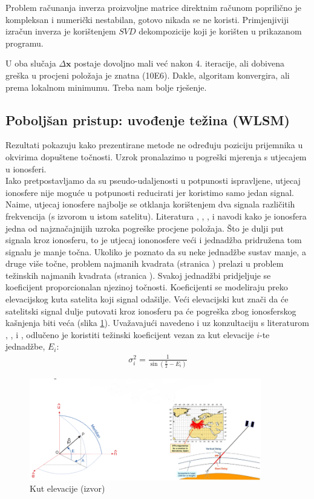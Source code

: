 \documentclass[a4paper,twoside,12pt]{memoir} %
\begin{document}
Problem računanja inverza proizvoljne matrice direktnim računom poprilično je kompleksan i numerički nestabilan, gotovo nikada se ne koristi. 
Primjenjiviji izračun inverza je korištenjem $SVD$ dekompozicije koji je korišten u prikazanom programu.

U oba slučaja $\Delta \mathbf{x}$ postaje dovoljno mali već nakon 4. iteracije, ali dobivena greška u 
procjeni položaja je znatna (10E6).
Dakle, algoritam konvergira, ali prema lokalnom minimumu.
Treba nam bolje rješenje.



\subsection{Poboljšan pristup: uvođenje težina (WLSM)}%
Rezultati pokazuju kako prezentirane metode ne određuju poziciju prijemnika u okvirima dopuštene točnosti.
Uzrok pronalazimo u pogreški mjerenja s utjecajem u ionosferi.\\
Iako pretpostavljamo da su pseudo-udaljenosti u potpunosti ispravljene, utjecaj ionosfere nije moguće u potpunosti reducirati jer koristimo samo jedan signal.
Naime, utjecaj ionosfere najbolje se otklanja korištenjem dva signala različitih frekvencija (s izvorom u istom satelitu). 
Literatura \cite{ref:4}, \cite{ref:9}, \cite{ref:10}, \cite{ref:38} i
\cite{ref:34} navodi kako je ionosfera jedna od najznačajnijih uzroka pogreške
procjene položaja.
Što je dulji put signala kroz ionosferu, to je utjecaj iononosfere veći i jednadžba pridružena tom signalu
je manje točna. Ukoliko je poznato da su neke jednadžbe sustav manje, a druge više točne, problem najmanih kvadrata
(stranica \pageref{code:iterLSM}) prelazi u problem težinskih najmanih kvadrata (stranica \pageref{code:iterLSMW}).
Svakoj jednadžbi pridjeljuje se koeficijent proporcionalan njezinoj točnosti.
Koeficijenti se modeliraju preko elevacijskog kuta satelita koji signal odašilje.
Veći elevacijski kut znači da će satelitski signal dulje putovati kroz ionosferu pa će pogreška
zbog ionosferskog kašnjenja biti veća (slika \ref{fig:elev}).
Uvažavajući navedeno i uz konzultaciju s literaturom \cite{ref:13}, \cite{ref:34},
\cite{ref:45} i \cite{ref:25}, odlučeno je koristiti težinski koeficijent vezan za kut elevacije $i$-te jednadžbe, $E_i$:
\begin{align}
\sigma^2_i = \frac{1}{ \sin ( \frac{\pi}{2}  - E_i ) }
\end{align}

\begin{figure}[h]
	\centering
	\includegraphics[width=0.9\textwidth]{elev}
	\caption{Kut elevacije (izvor)}
	\label{fig:elev}
\end{figure}
\end{document}

